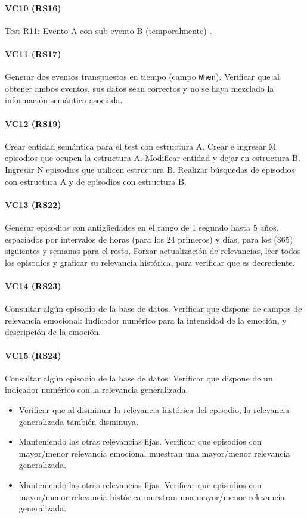 \paragraph{VC10 (RS16)}
Test R11: Evento A con sub evento B (temporalmente)
.


\paragraph{VC11 (RS17)}
Generar dos eventos transpuestos en tiempo (campo \texttt{When}). Verificar que al obtener ambos eventos, sus datos sean correctos y no se haya mezclado la información semántica asociada.


\paragraph{VC12 (RS19)}
Crear entidad semántica para el test con estructura A. Crear e ingresar M episodios que ocupen la estructura A. Modificar entidad y dejar en estructura B. Ingresar N episodios que utilicen estructura B. Realizar búsquedas de episodios con estructura A y de episodios con estructura B.


\paragraph{VC13 (RS22)}
Generar episodios con antigüedades en el rango de 1 segundo hasta 5 años, espaciados por intervalos de horas (para los 24 primeros) y días, para los (365) siguientes y semanas para el resto. Forzar actualización de relevancias, leer todos los episodios y graficar su relevancia histórica, para verificar que es decreciente.

\paragraph{VC14 (RS23)}
Consultar algún episodio de la base de datos. Verificar que dispone de campos de relevancia emocional: Indicador numérico para la intensidad de la emoción, y descripción de la emoción.

\paragraph{VC15 (RS24)}
Consultar algún episodio de la base de datos. Verificar que dispone de un indicador numérico con la relevancia generalizada.
\begin{itemize}
	\item Verificar que al disminuir la relevancia histórica del episodio, la relevancia generalizada también disminuya.
	\item Manteniendo las otras relevancias fijas. Verificar que episodios con mayor/menor relevancia emocional muestran una mayor/menor relevancia generalizada.
	\item Manteniendo las otras relevancias fijas. Verificar que episodios con mayor/menor relevancia histórica muestran una mayor/menor relevancia generalizada.
\end{itemize}

